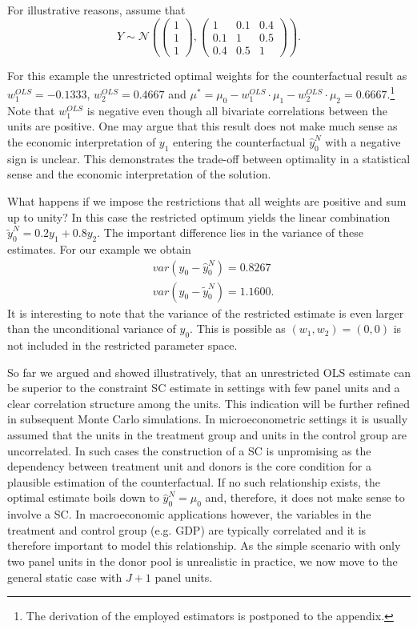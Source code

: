 For illustrative reasons, assume that 
\[
Y \sim \mathcal{N}\left( 
\begin{pmatrix} 1\\ 1\\ 1 \end{pmatrix}, 
\begin{pmatrix} 1 &0.1 &0.4\\0.1 &1 &0.5\\0.4 &0.5 &1 \end{pmatrix}\right). 
\] 

For this example the unrestricted optimal weights for the counterfactual result as $w_1^{OLS} = -0.1333$, $w_2^{OLS} = 0.4667$ and $\mu^* = \mu_0 - w_1^{OLS} \cdot \mu_1 - w_2^{OLS} \cdot \mu_2 = 0.6667$.\footnote{The derivation of the employed estimators is postponed to the appendix.} Note that $w_1^{OLS}$ is negative even though all bivariate correlations between the units are positive. One may argue that this result does not make much sense as the economic interpretation of $y_1$ entering the counterfactual $\widehat{y}^{N}_{0}$ with a negative sign is unclear. This demonstrates the trade-off between optimality in a statistical sense and the economic interpretation of the solution.  

What happens if we impose the restrictions that all weights are positive and sum up to unity? In this case the restricted optimum yields the linear combination $\widetilde{y}^{N}_{0} = 0.2 y_1 + 0.8 y_2$.
The important difference lies in the variance of these estimates. For our example we obtain
\begin{equation*}
	\begin{split}
		& var(y_0 - \widehat{y}^{N}_{0}) = 0.8267 \\
		& var(y_0 - \widetilde{y}^{N}_{0}) = 1.1600.
	\end{split}
\end{equation*}
It is interesting to note that the variance of the restricted estimate is even larger than the unconditional variance of $y_0$. This is possible as $(w_1, w_2) = (0,0)$ is not included in the restricted parameter space. 

So far we argued and showed illustratively, that an unrestricted \ac{OLS} estimate can be superior to the constraint \ac{SC} estimate in settings with few panel units and a clear correlation structure among the units. This indication will be further refined in subsequent Monte Carlo simulations. In microeconometric settings it is usually assumed that the units in the treatment group and units in the control group are uncorrelated. In such cases the construction of a \ac{SC} is unpromising as the dependency between treatment unit and donors is the core condition for a plausible estimation of the counterfactual. If no such relationship exists, the optimal estimate boils down to $\widehat{y}^{N}_{0} = \mu_0$ and, therefore, it does not make sense to involve a \ac{SC}. In macroeconomic applications however, the variables in the treatment and control group (e.g. \ac{GDP}) are typically correlated and it is therefore important to model this relationship. As the simple scenario with only two panel units in the donor pool is unrealistic in practice, we now move to the general static case with $J+1$ panel units.
